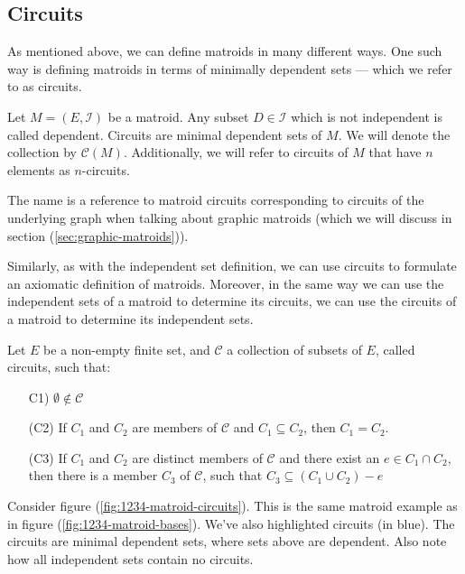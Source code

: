 \subsection{Circuits}\label{sec:circuits}
As mentioned above, we can define matroids in many different ways. One such way is defining matroids in terms of minimally dependent sets --- which we refer to as circuits.

\begin{defn}
Let $M = (E, \mathcal{I})$ be a matroid. Any subset $D \in \mathcal{I}$ which is not independent is called dependent. Circuits are minimal dependent sets of $M$. We will denote the collection by $\mathcal{C}(M)$. Additionally, we will refer to circuits of $M$ that have $n$ elements as $n$-circuits.
\end{defn}

The name is a reference to matroid circuits corresponding to circuits of the underlying graph when talking about graphic matroids (which we will discuss in section (\ref{sec:graphic-matroids})).

Similarly, as with the independent set definition, we can use circuits to formulate an axiomatic definition of matroids. Moreover, in the same way we can use the independent sets of a matroid to determine its circuits, we can use the circuits of a matroid to determine its independent sets.

\begin{defn}
    Let $E$ be a non-empty finite set, and $\mathcal{C}$ a collection of subsets of $E$, called circuits, such that:

    \begin{enumerate}
        \item[C1)] $\emptyset \notin \mathcal{C}$

        \item[(C2)] If $C_1$ and $C_2$ are members of $\mathcal{C}$ and $C_1 \subseteq C_2$, then $C_1 = C_2$.

        \item[(C3)] If $C_1$ and $C_2$ are distinct members of $\mathcal{C}$ and there exist an $e \in C_1 \cap C_2$, then there is a member $C_3$ of $\mathcal{C}$, such that $C_3 \subseteq (C_1  \cup C_2) - e$
    \end{enumerate}
    
\end{defn}

\begin{exmp}
  Consider figure (\ref{fig:1234-matroid-circuits}). This is the same matroid example as in figure (\ref{fig:1234-matroid-bases}). We've also highlighted circuits (in blue). The circuits are minimal dependent sets, where sets above are dependent. Also note how all independent sets contain no circuits.
\end{exmp}

